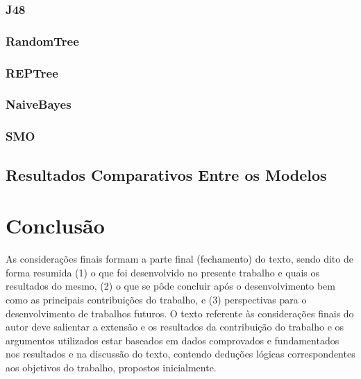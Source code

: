 \documentclass[
	12pt,				%
	openright,			%
	oneside,	
	a4paper,				%
	english,				%
	brazil				%
]{abntex2/abntex2} %
\begin{document}
	\subsection{J48}
	
	\subsection{RandomTree}

	\subsection{REPTree}	

	\subsection{NaiveBayes}

	\subsection{SMO}

	
	\section{Resultados Comparativos Entre os Modelos}
	
		
\chapter{Conclusão}

	As considerações finais formam a parte final (fechamento) do texto, sendo dito de forma resumida (1) o que foi desenvolvido no presente trabalho e quais os resultados do mesmo, (2) o que se pôde concluir após o desenvolvimento bem como as principais contribuições do trabalho, e (3) perspectivas para o desenvolvimento de trabalhos futuros. O texto referente às considerações finais do autor deve salientar a extensão e os resultados da contribuição do trabalho e os argumentos utilizados estar baseados em dados comprovados e fundamentados nos resultados e na discussão do texto, contendo deduções lógicas correspondentes aos objetivos do trabalho, propostos inicialmente.

\postextual
{}
\end{document}
